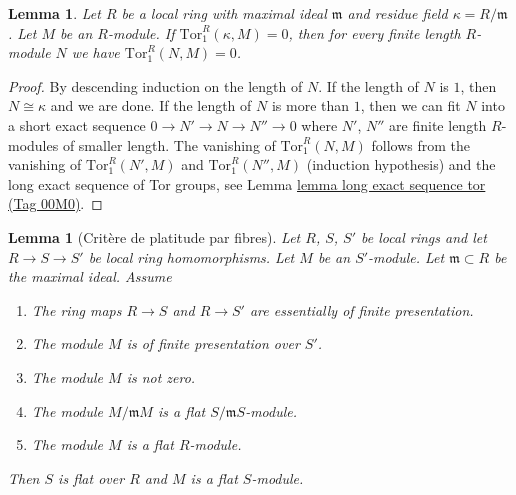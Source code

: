 \documentclass{amsart}
\theoremstyle{plain}
\newtheorem{lemma}[subsection]{Lemma}
\theoremstyle{definition}
\theoremstyle{remark}
\numberwithin{equation}{subsection}
\begin{document}
\begin{lemma}
\label{lemma-prepare-local-criterion-flatness}
Let $R$ be a local ring with maximal ideal $\mathfrak m$
and residue field $\kappa = R/\mathfrak m$.
Let $M$ be an $R$-module. If $\text{Tor}_1^R(\kappa, M) = 0$,
then for every finite length $R$-module $N$ we have
$\text{Tor}_1^R(N, M) = 0$.
\end{lemma}

\begin{proof}
By descending induction on the length of $N$.
If the length of $N$ is $1$, then $N \cong \kappa$
and we are done. If the length of $N$ is more than
$1$, then we can fit $N$ into a short exact sequence
$0 \to N' \to N \to N'' \to 0$ where $N'$, $N''$ are
finite length $R$-modules of smaller length.
The vanishing of $\text{Tor}_1^R(N, M)$ follows
from the vanishing of $\text{Tor}_1^R(N', M)$
and $\text{Tor}_1^R(N'', M)$ (induction hypothesis)
and the long exact sequence of Tor groups, see Lemma
\href{https://stacks.math.columbia.edu/tag/00M0}{lemma long exact sequence tor (Tag 00M0)}.
\end{proof}


\begin{lemma}[Crit\`ere de platitude par fibres]
\label{lemma-criterion-flatness-fibre}
Let $R$, $S$, $S'$ be local rings and let $R \to S \to S'$ be local ring
homomorphisms. Let $M$ be an $S'$-module. Let $\mathfrak m \subset R$
be the maximal ideal. Assume
\begin{enumerate}
\item The ring maps $R \to S$ and $R \to S'$ are essentially
of finite presentation.
\item The module $M$ is of finite presentation over $S'$.
\item The module $M$ is not zero.
\item The module $M/\mathfrak mM$ is a flat $S/\mathfrak mS$-module.
\item The module $M$ is a flat $R$-module.
\end{enumerate}
Then $S$ is flat over $R$ and $M$ is a flat $S$-module.
\end{lemma}
\end{document}
